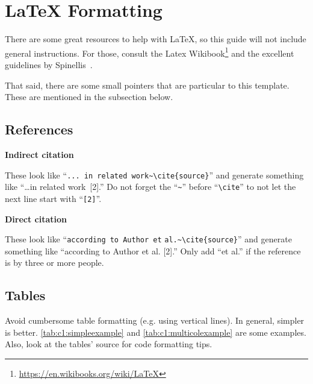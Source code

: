\section{\LaTeX{} Formatting}
\label{sec:c1:latex}

There are some great resources to help with \LaTeX,
so this guide will not include general instructions.
For those, consult the Latex Wikibook\footnote{\url{https://en.wikibooks.org/wiki/LaTeX}}
and the excellent guidelines by Spinellis~\cite{spinellis:latexadvice}.

That said, there are some small pointers that are particular to this template.
These are mentioned in the subsection below.

\subsection{References}
\label{sec:c1:References}

\noindent
\textbf{Indirect citation}

These look like ``\verb|... in related work~\cite{source}|'' and generate something like ``\dots in related work~[2].''
Do not forget the ``\verb|~|'' before ``\verb|\cite|'' to not let the next line start with ``\verb|[2]|''.

\vspace{0.5cm}
\noindent
\textbf{Direct citation}

These look like ``\texttt{according to Author et} \verb|al.~\cite{source}|'' and generate something like ``according to Author et al. [2].''
Only add ``et al.'' if the reference is by three or more people.

\subsection{Tables}
\label{sec:c1:latex_tables}

Avoid cumbersome table formatting (e.g. using vertical lines).
In general, simpler is better.
\autoref{tab:c1:simpleexample} and \autoref{tab:c1:multicolexample} are some examples.
Also, look at the tables' source for code formatting tips.

